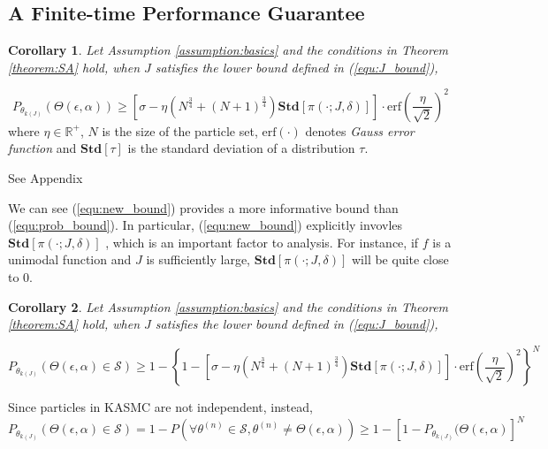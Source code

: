 \documentclass{article} %
\newtheorem{corollary}{Corollary}
\newenvironment{proof}[1][Proof]{\begin{trivlist}
\item[\hskip \labelsep {\bfseries #1}]}{\end{trivlist}}
\begin{document}
\subsection{A Finite-time Performance Guarantee}
\begin{corollary}
	Let Assumption \ref{assumption:basics} and the conditions in Theorem \ref{theorem:SA} hold, when $J$ satisfies the lower bound defined in (\ref{equ:J_bound}),
	\label{corollary:new}
\end{corollary}
\begin{equation}
	P_{\theta_{k(J)}}(\Theta(\epsilon,\alpha))\geq \left[\sigma-\eta (N^{\frac{3}{4}}+(N+1)^{\frac{3}{4}})\mathbf{Std}[\pi(\cdot;J,\delta)]\right] \cdot \text{erf}(\frac{\eta}{\sqrt{2}})^2
\label{equ:new_bound}
\end{equation}
where $\eta\in\mathbb{R}^+$, $N$ is the size of the particle set, $\text{erf}(\cdot)$ denotes \emph{Gauss error function} and $\mathbf{Std}[\tau]$ is the standard deviation of a distribution $\tau$.    
\begin{proof}
	See Appendix
\end{proof}
We can see (\ref{equ:new_bound}) provides a more informative bound than (\ref{equ:prob_bound}). In particular, (\ref{equ:new_bound}) explicitly 
invovles $\mathbf{Std}[\pi(\cdot;J,\delta)]$ , which is an important factor to analysis. For instance, if $f$ is a unimodal function and $J$ is 
sufficiently large, $\mathbf{Std}[\pi(\cdot;J,\delta)]$ will be quite close to 0.  
\begin{corollary}
	Let Assumption \ref{assumption:basics} and the conditions in Theorem \ref{theorem:SA} hold, when $J$ satisfies the lower bound defined in (\ref{equ:J_bound}),
	\label{corollary:set_bound}
\end{corollary} 
\begin{equation}
	P_{\theta_{k(J)}}(\Theta(\epsilon,\alpha)\in \mathcal{S})\geq 1-\left\{1-\left[\sigma-\eta (N^{\frac{3}{4}}+(N+1)^{\frac{3}{4}})\mathbf{Std}[\pi(\cdot;J,\delta)]\right] \cdot \text{erf}(\frac{\eta}{\sqrt{2}})^2\right\}^N
\end{equation}
\begin{proof} Since particles in KASMC are not independent, instead,    
	\begin{equation}
		P_{\theta_{k(J)}}(\Theta(\epsilon,\alpha)\in \mathcal{S})=1-P(\forall \theta^{(n)} \in \mathcal{S}, \theta^{(n)}\neq \Theta(\epsilon,\alpha))\geq 1-[1-P_{\theta_{k(J)}}(\Theta(\epsilon,\alpha)]^N
	\end{equation}	
\end{proof}
\newpage 
\end{document}
